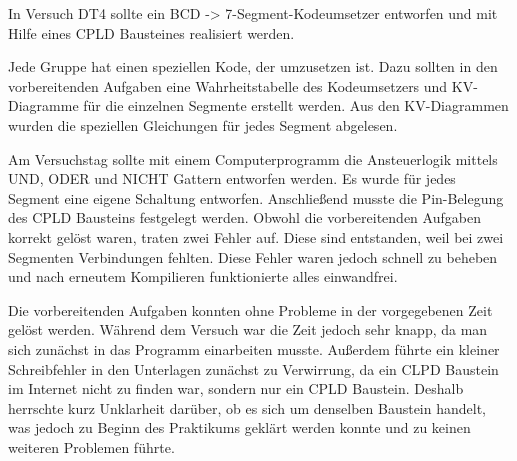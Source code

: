 In Versuch DT4 sollte ein BCD -> 7-Segment-Kodeumsetzer entworfen und mit Hilfe eines CPLD Bausteines realisiert werden.\par 
Jede Gruppe hat einen speziellen Kode, der umzusetzen ist. Dazu sollten in den vorbereitenden Aufgaben eine Wahrheitstabelle des Kodeumsetzers und KV-Diagramme für die einzelnen Segmente erstellt werden. Aus den KV-Diagrammen wurden die speziellen Gleichungen für jedes Segment abgelesen. \par
Am Versuchstag sollte mit einem Computerprogramm die Ansteuerlogik mittels UND, ODER und NICHT Gattern entworfen werden. Es wurde für jedes Segment eine eigene Schaltung entworfen. Anschließend musste die Pin-Belegung des CPLD Bausteins festgelegt werden. Obwohl die vorbereitenden Aufgaben korrekt gelöst waren, traten zwei Fehler auf. Diese sind entstanden, weil bei zwei Segmenten Verbindungen fehlten. Diese Fehler waren jedoch schnell zu beheben und nach erneutem Kompilieren funktionierte alles einwandfrei. \par
Die vorbereitenden Aufgaben konnten ohne Probleme in der vorgegebenen Zeit gelöst werden. Während dem Versuch war die Zeit jedoch sehr knapp, da man sich zunächst in das Programm einarbeiten musste. Außerdem führte ein kleiner Schreibfehler in den Unterlagen zunächst zu Verwirrung, da ein CLPD Baustein im Internet nicht zu finden war, sondern nur ein CPLD Baustein. Deshalb herrschte kurz Unklarheit darüber, ob es sich um denselben Baustein handelt, was jedoch zu Beginn des Praktikums geklärt werden konnte und zu keinen weiteren Problemen führte.
 